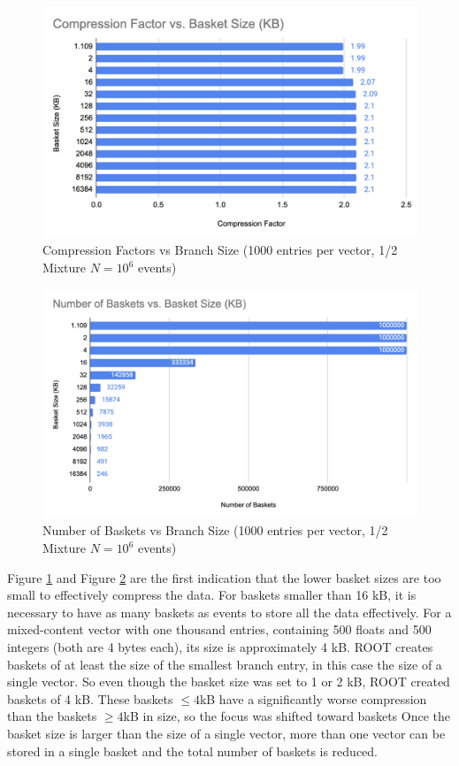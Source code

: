 \begin{figure}[h]
    \centering
    \includegraphics[width=.8\textwidth]{content/toymodel_content/Compression Factor vs. Branch Size (KB).png}
    \caption{Compression Factors vs Branch Size (1000 entries per vector, 1/2 Mixture $N=10^6$ events)}
    \label{fig:toymodel_CFvsBranchSize_1/2mixture}
\end{figure}

\begin{figure}[h]
    \centering
    \includegraphics[width=.8\textwidth]{content/toymodel_content/Number of Baskets vs Branch Size.png}
    \caption{Number of Baskets vs Branch Size (1000 entries per vector, 1/2 Mixture $N=10^6$ events)}
    \label{fig:toymodel_NumBasketsvsBranchSize_1/2mixture}
\end{figure}

Figure \ref{fig:toymodel_CFvsBranchSize_1/2mixture} and Figure \ref{fig:toymodel_NumBasketsvsBranchSize_1/2mixture} are the first indication that the lower basket sizes are too small to effectively compress the data. 
For baskets smaller than 16 kB, it is necessary to have as many baskets as events to store all the data effectively.
For a mixed-content vector with one thousand entries, containing 500 floats and 500 integers (both are 4 bytes each), its size is approximately 4 kB.
ROOT creates baskets of at least the size of the smallest branch entry, in this case the size of a single vector.
So even though the basket size was set to 1 or 2 kB, ROOT created baskets of 4 kB.
These baskets $\leq 4$kB have a significantly worse compression than the baskets $\geq 4$kB in size, so the focus was shifted toward baskets  
Once the basket size is larger than the size of a single vector, more than one vector can be stored in a single basket and the total number of baskets is reduced.

